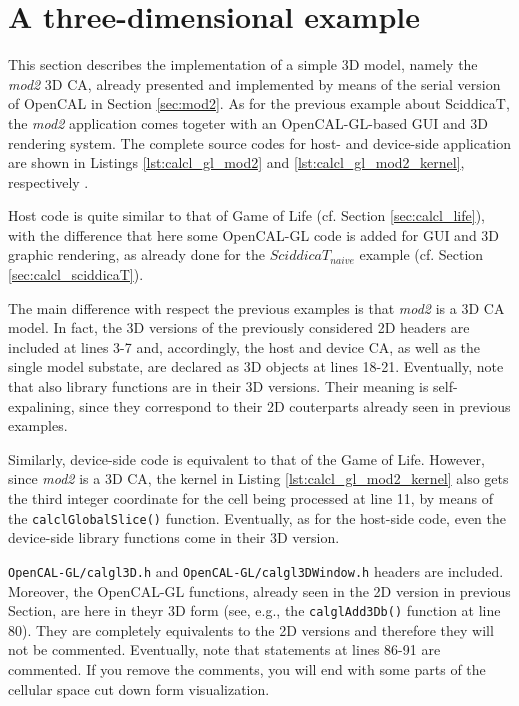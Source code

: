 \section{A three-dimensional example}

This section describes the implementation of a simple 3D model, namely
the \emph{mod2} 3D CA, already presented and implemented by means of
the serial version of OpenCAL in Section \ref{sec:mod2}. As for the
previous example about SciddicaT, the \emph{mod2} application comes
togeter with an OpenCAL-GL-based GUI and 3D rendering system. The
complete source codes for host- and device-side application are shown
in Listings \ref{lst:calcl_gl_mod2} and
\ref{lst:calcl_gl_mod2_kernel}, respectively .







Host code is quite similar to that of Game of Life (cf. Section
\ref{sec:calcl_life}), with the difference that here some OpenCAL-GL
code is added for GUI and 3D graphic rendering, as already done for
the $SciddicaT_{naive}$ example (cf. Section
\ref{sec:calcl_sciddicaT}).

The main difference with respect the previous examples is that
\emph{mod2} is a 3D CA model. In fact, the 3D versions of the
previously considered 2D headers are included at lines 3-7 and,
accordingly, the host and device CA, as well as the single model
substate, are declared as 3D objects at lines 18-21. Eventually, note
that also library functions are in their 3D versions. Their meaning is
self-expalining, since they correspond to their 2D couterparts already
seen in previous examples.

Similarly, device-side code is equivalent to that of the Game of
Life. However, since \emph{mod2} is a 3D CA, the kernel in Listing
\ref{lst:calcl_gl_mod2_kernel} also gets the third integer coordinate
for the cell being processed at line 11, by means of the
\verb'calclGlobalSlice()' function. Eventually, as for the host-side
code, even the device-side library functions come in their 3D version.

\verb'OpenCAL-GL/calgl3D.h' and \verb'OpenCAL-GL/calgl3DWindow.h'
headers are included. Moreover, the OpenCAL-GL functions, already seen
in the 2D version in previous Section, are here in theyr 3D form (see,
e.g., the \verb'calglAdd3Db()' function at line 80). They
are completely equivalents to the 2D versions and therefore they will
not be commented. Eventually, note that statements at lines 86-91 are
commented. If you remove the comments, you will end with some parts of
the cellular space cut down form visualization.

